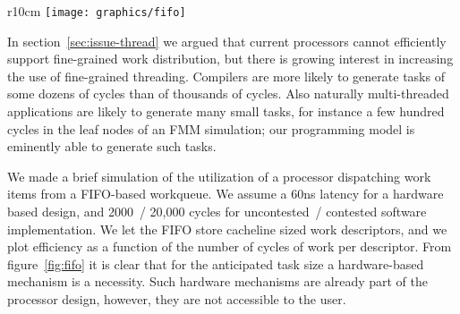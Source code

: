\begin{wrapfigure}{r}{10cm}
  \texttt{[image: graphics/fifo]}
  \caption{Plot of processor utilization as function of cycles of work per
    descriptor for different work queue latencies}
  \label{fig:fifo}
\end{wrapfigure}
In section~\ref{sec:issue-thread} we argued that  current
processors cannot efficiently support fine-grained work distribution, 
but there is growing interest in increasing the use of fine-grained 
threading.  Compilers are more likely to generate tasks of some
dozens of cycles than of thousands of cycles. Also naturally
multi-threaded applications are likely to generate many small tasks,
for instance a few hundred cycles in the leaf nodes of an \ac{FMM}
simulation; our programming model is eminently able to 
generate such tasks.

We made a brief simulation of the utilization of a processor
dispatching work items from a FIFO-based workqueue. We assume a 60ns
latency for a hardware based design, and 2000~/ 20,000 cycles for
uncontested~/ contested software implementation. We let the FIFO store
cacheline sized work descriptors, and we plot efficiency as a function
of the number of cycles of work per descriptor.
From figure~\ref{fig:fifo} it is clear that for the anticipated task size
a hardware-based mechanism is a necessity. Such hardware mechanisms are already part
of the processor design, however, they are not accessible to the user.

